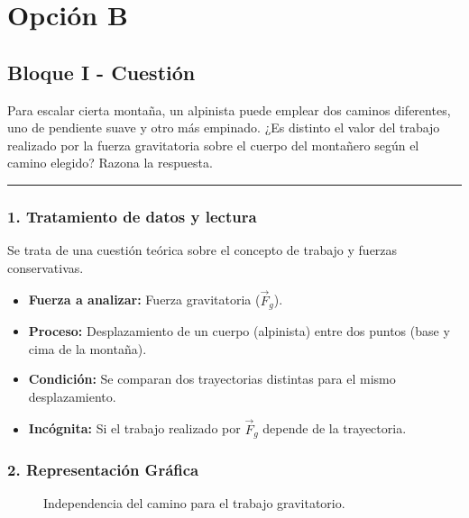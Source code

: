 \section{Opción B}
\label{sec:B_2013_jun_ord}

\subsection{Bloque I - Cuestión}
\label{subsec:I_B_2013_jun_ord}

\begin{cajaenunciado}
Para escalar cierta montaña, un alpinista puede emplear dos caminos diferentes, uno de pendiente suave y otro más empinado. ¿Es distinto el valor del trabajo realizado por la fuerza gravitatoria sobre el cuerpo del montañero según el camino elegido? Razona la respuesta.
\end{cajaenunciado}
\hrule

\subsubsection*{1. Tratamiento de datos y lectura}
Se trata de una cuestión teórica sobre el concepto de trabajo y fuerzas conservativas.
\begin{itemize}
    \item \textbf{Fuerza a analizar:} Fuerza gravitatoria ($\vec{F}_g$).
    \item \textbf{Proceso:} Desplazamiento de un cuerpo (alpinista) entre dos puntos (base y cima de la montaña).
    \item \textbf{Condición:} Se comparan dos trayectorias distintas para el mismo desplazamiento.
    \item \textbf{Incógnita:} Si el trabajo realizado por $\vec{F}_g$ depende de la trayectoria.
\end{itemize}

\subsubsection*{2. Representación Gráfica}
\begin{figure}[H]
    \centering
    \caption{Independencia del camino para el trabajo gravitatorio.}
\end{figure}

